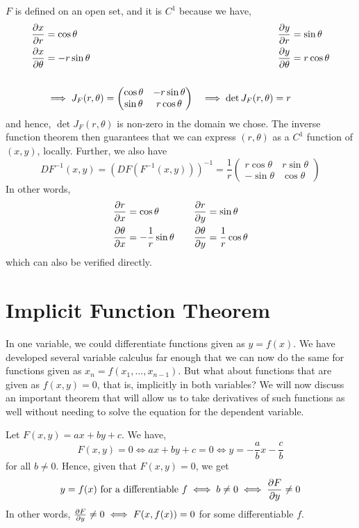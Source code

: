 \documentclass[../Analysis-3.tex]{subfiles}
\begin{document}
\( F \) is defined on an open set, and it is \( C^1 \) because we have,
\begin{alignat*}{4}
  \pdv{x}{r}      & = \cos \theta \quad              & \pdv{y}{r}      & = \sin \theta   \\
  \pdv{x}{\theta} & = -r \sin \theta \quad           & \pdv{y}{\theta} & = r \cos \theta \\
  \\
                  & \implies J_F(r, \theta) =
  \begin{pmatrix}
    \cos \theta & -r \sin \theta \\
    \sin \theta & r \cos \theta
  \end{pmatrix}
                  & \implies \det J_F(r, \theta) = r
\end{alignat*}
and hence, \( \det J_F(r, \theta) \) is non-zero in the domain we chose. The inverse function theorem then guarantees that we can express \( (r, \theta) \) as a \( C^1 \) function of \( (x, y) \), locally. Further, we also have
\[
  DF^{-1}(x,y) = \left( DF(F^{-1}(x,y)) \right)^{-1} = \frac 1r \begin{pmatrix}
    r \cos \theta & r \sin \theta \\
    -\sin \theta  & \cos \theta
  \end{pmatrix}
\]
In other words,
\begin{alignat*}{4}
  \pdv{r}{x}      & = \cos \theta \quad           & \pdv{r}{y}      & = \sin \theta          \\
  \pdv{\theta}{x} & = -\frac 1r \sin \theta \quad & \pdv{\theta}{y} & = \frac 1r \cos \theta \\
\end{alignat*}
which can also be verified directly.
\pagebreak

\section{Implicit Function Theorem}

In one variable, we could differentiate functions given as \( y = f(x) \). We have developed several variable calculus far enough that we can now do the same for functions given as \( x_n = f(x_1, \dots, x_{n-1}) \). But what about functions that are given as \( f(x,y) = 0 \), that is, implicitly in both variables? We will now discuss an important theorem that will allow us to take derivatives of such functions as well without needing to solve the equation for the dependent variable.

\begin{Eg}{}{}
  Let \( F(x,y) = ax+by+c \). We have,
  \[
    F(x,y) = 0 \iff ax+by+c = 0 \iff y = -\frac ab x - \frac cb
  \]
  for all \( b \neq 0 \). Hence, given that \( F(x,y) = 0 \), we get
  \[
    y = f(x) \text{ for a differentiable } f \iff b \neq 0 \iff \pdv{F}{y} \neq 0
  \]
  In other words, \( \pdv{F}{y} \neq 0 \iff F(x,f(x)) = 0 \) for some differentiable \( f \).
\end{Eg}
\end{document}
